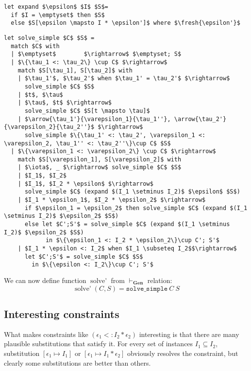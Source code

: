 \documentclass[declaration,shortabstract]{iithesis}
\newcommand{\arrow}[3]{{#1}\rightarrow_{#2}{#3}}
\newcommand{\fresh}[1]{\ensuremath{\operatorname{fresh}({#1})}}
\begin{document}
\begin{lstlisting}
let expand $\epsilon$ $I$ $S$= 
  if $I = \emptyset$ then $S$
  else $S[\epsilon \mapsto I * \epsilon']$ where $\fresh{\epsilon'}$
\end{lstlisting}
\begin{lstlisting}
let solve_simple $C$ $S$ = 
  match $C$ with
  | $\emptyset$        $\rightarrow$ $\emptyset; S$
  | $\{\tau_1 <: \tau_2\} \cup C$ $\rightarrow$
    match $S[\tau_1], S[\tau_2]$ with
    | $\tau_1'$, $\tau_2'$ when $\tau_1' = \tau_2'$ $\rightarrow$
      solve_simple $C$ $S$
    | $t$, $\tau$
    | $\tau$, $t$ $\rightarrow$
      solve_simple $C$ $S[t \mapsto \tau]$
    | $\arrow{\tau_1'}{\varepsilon_1}{\tau_1''}, \arrow{\tau_2'}{\varepsilon_2}{\tau_2''}$ $\rightarrow$
      solve_simple $\{\tau_1' <: \tau_2', \varepsilon_1 <: \varepsilon_2, \tau_1'' <: \tau_2''\}\cup C$ $S$
  | $\{\varepsilon_1 <: \varepsilon_2\} \cup C$ $\rightarrow$
    match $S[\varepsilon_1], S[\varepsilon_2]$ with
    | $\iota$, _ $\rightarrow$ solve_simple $C$ $S$
    | $I_1$, $I_2$ 
    | $I_1$, $I_2 * \epsilon$ $\rightarrow$
      solve_simple $C$ (expand $(I_1 \setminus I_2)$ $\epsilon$ $S$)
    | $I_1 * \epsilon_1$, $I_2 * \epsilon_2$ $\rightarrow$
      if $\epsilon_1 = \epsilon_2$ then solve_simple $C$ (expand $(I_1 \setminus I_2)$ $\epsilon_2$ $S$)
      else let $C';S'$ = solve_simple $C$ (expand $(I_1 \setminus I_2)$ $\epsilon_2$ $S$) 
            in $\{\epsilon_1 <: I_2 * \epsilon_2\}\cup C'; S'$
    | $I_1 * \epsilon <: I_2$ when $I_1 \subseteq I_2$$\rightarrow$
      let $C';S'$ = solve_simple $C$ $S$ 
        in $\{\epsilon <: I_2\}\cup C'; S'$
\end{lstlisting}

We can now define function $\operatorname{solve'}$ from $ \vdash_\textbf{Gen} $ relation:
$$ \operatorname{solve'}(C, S) = \texttt{solve\_simple}\:C\:S $$ 

\subsection{Interesting constraints}
What makes constraints like $(\epsilon_1 <: I_2 * \epsilon_2)$ interesting is that there are many
plausible substitutions that satisfy it.
For every set of instances $I_1 \subseteq I_2$, substitution $[\epsilon_1 \mapsto I_1]$ or 
$[\epsilon_1 \mapsto I_1 * \epsilon_2]$ obviously resolves the constraint, but clearly some substitutions are better than others. 
\end{document}
